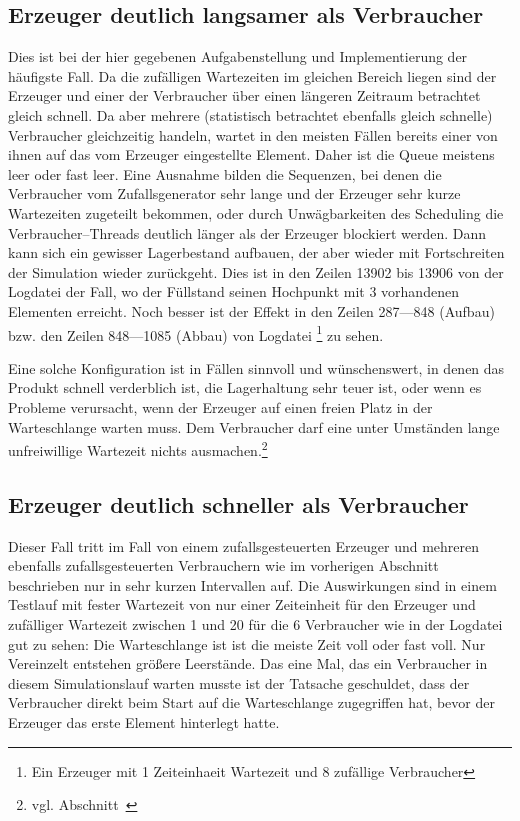 \subsection{Erzeuger deutlich langsamer als Verbraucher} %
\label{sub:erzeuger_langsamer_als_verbraucher}
Dies ist bei der hier gegebenen Aufgabenstellung und Implementierung der häufigste Fall. Da die zufälligen Wartezeiten im gleichen Bereich liegen sind der Erzeuger und einer der Verbraucher über einen längeren Zeitraum betrachtet gleich schnell. Da aber mehrere (statistisch betrachtet ebenfalls gleich schnelle) Verbraucher gleichzeitig handeln, wartet in den meisten Fällen bereits einer von ihnen auf das vom Erzeuger eingestellte Element. Daher ist die Queue meistens leer oder fast leer. Eine Ausnahme bilden die Sequenzen, bei denen die Verbraucher vom Zufallsgenerator sehr lange und der Erzeuger sehr kurze Wartezeiten zugeteilt bekommen, oder durch Unwägbarkeiten des Scheduling die Verbraucher–Threads deutlich länger als der Erzeuger blockiert werden. Dann kann sich ein gewisser Lagerbestand aufbauen, der aber wieder mit Fortschreiten der Simulation wieder zurückgeht. Dies ist in den Zeilen 13902 bis 13906 von der Logdatei  der Fall, wo der Füllstand seinen Hochpunkt mit 3 vorhandenen Elementen erreicht. Noch besser ist der Effekt in den Zeilen 287—848 (Aufbau) bzw. den Zeilen 848—1085 (Abbau) von Logdatei \footnote{Ein Erzeuger mit 1 Zeiteinhaeit Wartezeit und 8 zufällige Verbraucher} zu sehen.

Eine solche Konfiguration ist in Fällen sinnvoll und wünschenswert, in denen das Produkt schnell verderblich ist, die Lagerhaltung sehr teuer ist, oder wenn es Probleme verursacht, wenn der Erzeuger auf einen freien Platz in der Warteschlange warten muss. Dem Verbraucher darf eine unter Umständen lange unfreiwillige Wartezeit nichts ausmachen.\footnote{vgl. Abschnitt~}


\subsection{Erzeuger deutlich schneller als Verbraucher} %
\label{sub:erzeuger_schneller_als_verbraucher}
Dieser Fall tritt im Fall von einem zufallsgesteuerten Erzeuger und mehreren ebenfalls zufallsgesteuerten Verbrauchern wie im vorherigen Abschnitt beschrieben nur in sehr kurzen Intervallen auf. Die Auswirkungen sind in einem Testlauf mit fester Wartezeit von nur einer Zeiteinheit für den Erzeuger und zufälliger Wartezeit zwischen 1 und 20 für die 6 Verbraucher wie in der Logdatei  gut zu sehen: Die Warteschlange ist ist die meiste Zeit voll oder fast voll. Nur Vereinzelt entstehen größere Leerstände. Das eine Mal, das ein Verbraucher in diesem Simulationslauf warten musste ist der Tatsache geschuldet, dass der Verbraucher direkt beim Start auf die Warteschlange zugegriffen hat, bevor der Erzeuger das erste Element hinterlegt hatte.

